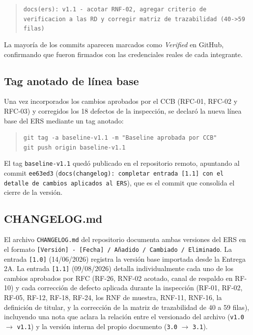 \documentclass[journal,onecolumn]{IEEEtran}
\begin{document}
	\begin{quote}
		\texttt{docs(ers): v1.1 - acotar RNF-02, agregar criterio de verificacion a las RD y corregir matriz de trazabilidad (40->59 filas)}
	\end{quote}
	
	La mayoría de los commits aparecen marcados como \textit{Verified} en GitHub, confirmando que fueron firmados con las credenciales reales de cada integrante.
	
	\subsection{Tag anotado de línea base}
	
	Una vez incorporados los cambios aprobados por el CCB (RFC-01, RFC-02 y RFC-03) y corregidos los 18 defectos de la inspección, se declaró la nueva línea base del ERS mediante un tag anotado:
	
	\begin{quote}
		\texttt{git tag -a baseline-v1.1 -m "Baseline aprobada por CCB"} \\
		\texttt{git push origin baseline-v1.1}
	\end{quote}
	
	El tag \texttt{baseline-v1.1} quedó publicado en el repositorio remoto, apuntando al commit \texttt{ee63ed3} (\texttt{docs(changelog): completar entrada [1.1] con el detalle de cambios aplicados al ERS}), que es el commit que consolida el cierre de la versión.
	
	\subsection{CHANGELOG.md}
	
	El archivo \texttt{CHANGELOG.md} del repositorio documenta ambas versiones del ERS en el formato \texttt{[Versión] - [Fecha] / Añadido / Cambiado / Eliminado}. La entrada \texttt{[1.0]} (14/06/2026) registra la versión base importada desde la Entrega 2A. La entrada \texttt{[1.1]} (09/08/2026) detalla individualmente cada uno de los cambios aprobados por RFC (RF-26, RNF-02 acotado, canal de respaldo en RF-10) y cada corrección de defecto aplicada durante la inspección (RF-01, RF-02, RF-05, RF-12, RF-18, RF-24, los RNF de muestra, RNF-11, RNF-16, la definición de titular, y la corrección de la matriz de trazabilidad de 40 a 59 filas), incluyendo una nota que aclara la relación entre el versionado del archivo (\texttt{v1.0} $\rightarrow$ \texttt{v1.1}) y la versión interna del propio documento (\texttt{3.0} $\rightarrow$ \texttt{3.1}).
	
\end{document}
